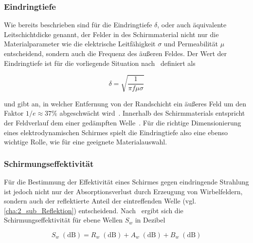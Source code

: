 \subsubsection{Eindringtiefe}\label{cha:2_subsub_Eindringtiefe}

Wie bereits beschrieben sind für die Eindringtiefe $\delta$, oder auch äquivalente Leitschichtdicke genannt, der Felder in des Schirmmaterial nicht nur die Materialparameter wie die elektrische Leitfähigkeit $\sigma$ und Permeabilität $\mu$ entscheidend, sondern auch die Frequenz des äußeren Feldes. Der Wert der Eindringtiefe ist für die vorliegende Situation nach~\cite{Taschenbuch_HF-Technik} definiert als

\begin{equation}
    \delta = \sqrt{\frac{1}{\pi f \mu \sigma}}
    \label{eq:2_Eindringtiefe}
\end{equation}

und gibt an, in welcher Entfernung von der Randschicht ein äußeres Feld um den Faktor $1/e \approx 37 \si{\percent}$ abgeschwächt wird~\cite{Taschenbuch_HF-Technik}. Innerhalb des Schirmmaterials entspricht der Feldverlauf dem einer gedämpften Welle~\cite{EM_Schirmung}. Für die richtige Dimensionierung eines elektrodynamischen Schirmes spielt die Eindringtiefe also eine ebenso wichtige Rolle, wie für eine geeignete Materialauswahl.


\subsubsection{Schirmungseffektivität}\label{cha:2_subsub_Schirmungseffektivitaet}

Für die Bestimmung der Effektivität eines Schirmes gegen eindringende Strahlung ist jedoch nicht nur der Absorptionsverlust durch Erzeugung von Wirbelfeldern, sondern auch der reflektierte Anteil der eintreffenden Welle (vgl. \Abschnitt\ref{cha:2_sub_Reflektion}) entscheidend. Nach~\cite{Problems_in_shielding_electronic_equiptment, NASA_SP-3067} ergibt sich die Schirmungseffektivität für ebene Wellen $S_w$ in Dezibel

\begin{equation}
    S_w \; \left(\text{dB}\right) = R_w \; \left(\text{dB}\right) + A_w \; \left(\text{dB}\right) + B_w \; \left(\text{dB}\right)
    \label{eq:2_Schirmungseffektivitaet}
\end{equation}

